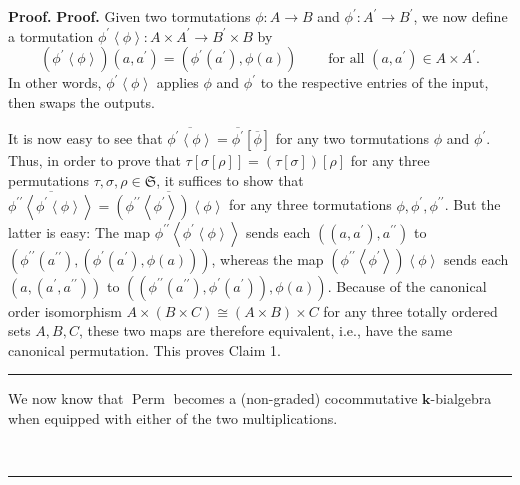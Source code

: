 \documentclass[numbers=enddot,12pt,final,onecolumn,notitlepage]{scrartcl}%
\theoremstyle{definition}
\newenvironment{proof}[1][Proof]{\noindent\textbf{#1.} }{\ \rule{0.5em}{0.5em}}
\begin{document}
\begin{proof}
\begin{proof}
Given two tormutations $\phi:A\rightarrow B$ and $\phi^{\prime}:A^{\prime
}\rightarrow B^{\prime}$, we now define a tormutation $\phi^{\prime
}\left\langle \phi\right\rangle :A\times A^{\prime}\rightarrow B^{\prime
}\times B$ by
\[
\left(  \phi^{\prime}\left\langle \phi\right\rangle \right)  \left(
a,a^{\prime}\right)  =\left(  \phi^{\prime}\left(  a^{\prime}\right)
,\phi\left(  a\right)  \right)  \ \ \ \ \ \ \ \ \ \ \text{for all }\left(
a,a^{\prime}\right)  \in A\times A^{\prime}.
\]
In other words, $\phi^{\prime}\left\langle \phi\right\rangle $ applies $\phi$
and $\phi^{\prime}$ to the respective entries of the input, then swaps the outputs.

It is now easy to see that $\overline{\phi^{\prime}\left\langle \phi
\right\rangle }=\overline{\phi^{\prime}}\left[  \overline{\phi}\right]  $ for
any two tormutations $\phi$ and $\phi^{\prime}$. Thus, in order to prove that
$\tau\left[  \sigma\left[  \rho\right]  \right]  =\left(  \tau\left[
\sigma\right]  \right)  \left[  \rho\right]  $ for any three permutations
$\tau,\sigma,\rho\in\mathfrak{S}$, it suffices to show that $\overline
{\phi^{\prime\prime}\left\langle \phi^{\prime}\left\langle \phi\right\rangle
\right\rangle }=\overline{\left(  \phi^{\prime\prime}\left\langle \phi
^{\prime}\right\rangle \right)  \left\langle \phi\right\rangle }$ for any
three tormutations $\phi,\phi^{\prime},\phi^{\prime\prime}$. But the latter is
easy: The map $\phi^{\prime\prime}\left\langle \phi^{\prime}\left\langle
\phi\right\rangle \right\rangle $ sends each $\left(  \left(  a,a^{\prime
}\right)  ,a^{\prime\prime}\right)  $ to $\left(  \phi^{\prime\prime}\left(
a^{\prime\prime}\right)  ,\left(  \phi^{\prime}\left(  a^{\prime}\right)
,\phi\left(  a\right)  \right)  \right)  $, whereas the map $\left(
\phi^{\prime\prime}\left\langle \phi^{\prime}\right\rangle \right)
\left\langle \phi\right\rangle $ sends each $\left(  a,\left(  a^{\prime
},a^{\prime\prime}\right)  \right)  $ to $\left(  \left(  \phi^{\prime\prime
}\left(  a^{\prime\prime}\right)  ,\phi^{\prime}\left(  a^{\prime}\right)
\right)  ,\phi\left(  a\right)  \right)  $. Because of the canonical order
isomorphism $A\times\left(  B\times C\right)  \cong\left(  A\times B\right)
\times C$ for any three totally ordered sets $A,B,C$, these two maps are
therefore equivalent, i.e., have the same canonical permutation. This proves
Claim 1.
\end{proof}

We now know that $\operatorname*{Perm}$ becomes a (non-graded) cocommutative
$\mathbf{k}$-bialgebra when equipped with either of the two multiplications.


\end{proof}
\end{document}
